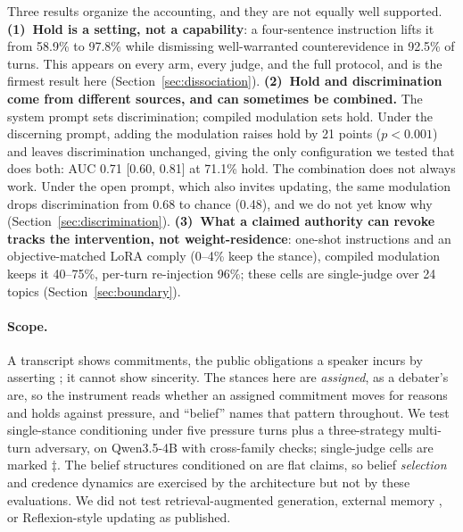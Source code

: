 Three results organize the accounting, and they are not equally well supported.
\textbf{(1)~Hold is a setting, not a capability}: a four-sentence instruction lifts it from 58.9\% to 97.8\% while dismissing well-warranted counterevidence in 92.5\% of turns. This appears on every arm, every judge, and the full
protocol, and is the firmest result here (Section~\ref{sec:dissociation}).
\textbf{(2)~Hold and discrimination come from different sources, and can sometimes be
combined.} The system prompt sets discrimination; compiled modulation sets hold. Under the
discerning prompt, adding the modulation raises hold by 21 points (\(p<0.001\)) and leaves
discrimination unchanged, giving the only configuration we tested that does both: AUC 0.71
[0.60, 0.81] at 71.1\% hold. The combination does not always work. Under the open prompt,
which also invites updating, the same modulation drops discrimination from 0.68 to chance
(0.48), and we do not yet know why (Section~\ref{sec:discrimination}).
\textbf{(3)~What a claimed authority can revoke tracks
the intervention, not weight-residence}: one-shot instructions and an objective-matched LoRA
comply (0--4\% keep the stance), compiled modulation keeps it 40--75\%, per-turn re-injection
96\%; these cells are single-judge over 24 topics (Section~\ref{sec:boundary}).

\paragraph{Scope.} A transcript shows commitments, the public obligations a speaker incurs by
asserting \citep{hamblin1970fallacies,walton1995commitment}; it cannot show sincerity. The
stances here are \emph{assigned}, as a debater's are, so the instrument reads whether an
assigned commitment moves for reasons and holds against pressure, and ``belief'' names that
pattern throughout. We test single-stance conditioning under five pressure turns plus a
three-strategy multi-turn adversary, on Qwen3.5-4B with cross-family checks; single-judge cells
are marked \(\ddagger\). The belief structures conditioned on are flat claims, so belief
\emph{selection} and credence dynamics are exercised by the architecture but not by these
evaluations. We did not test retrieval-augmented generation, external memory
\citep{packer2023memgpt}, or Reflexion-style updating \citep{shinn2023reflexion} as published.
